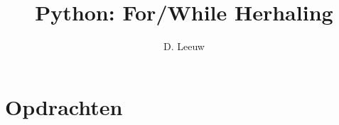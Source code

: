 \documentclass[a4paper,12pt,twoside,openright,titlepage]{article}
\author{D. Leeuw}
\title{Python: For/While Herhaling}
\date{\today\\
1.0.0\\
\vfill
\raggedright
\copyright\ 2025 Dennis Leeuw\\
}
\begin{document}

\maketitle



\section{Opdrachten}


\printindex
\end{document}
